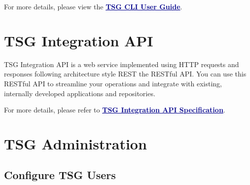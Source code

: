 For more details, please view the \textcolor{darkblue}{\textbf{\underline{TSG CLI User Guide}}}.

\section*{\hypertarget{link:TSG Integration API}{TSG Integration API}}
\label{sec:intro:api}

TSG Integration API is a web service implemented using HTTP requests and responses following architecture style REST the RESTful API. 
You can use this RESTful API to streamline your operations and integrate with existing, internally developed applications and repositories. 


For more details, please refer to \textcolor{darkblue}{\textbf{\underline{TSG Integration API Specification}}}.


\section*{\hypertarget{link:TSG Administration}{TSG Administration}}
\label{sec:intro:admin}

\subsection*{\hypertarget{link:Configure TSG Users}{Configure TSG Users}}
\label{sec:intro:admin:users}

